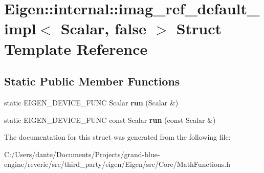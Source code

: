 \hypertarget{struct_eigen_1_1internal_1_1imag__ref__default__impl_3_01_scalar_00_01false_01_4}{}\section{Eigen\+::internal\+::imag\+\_\+ref\+\_\+default\+\_\+impl$<$ Scalar, false $>$ Struct Template Reference}
\label{struct_eigen_1_1internal_1_1imag__ref__default__impl_3_01_scalar_00_01false_01_4}
\subsection*{Static Public Member Functions}
\begin{DoxyCompactItemize}
\item 
\mbox{\label{struct_eigen_1_1internal_1_1imag__ref__default__impl_3_01_scalar_00_01false_01_4_a36b58269f7ca9930113cf22cc1df4b46}} 
static E\+I\+G\+E\+N\+\_\+\+D\+E\+V\+I\+C\+E\+\_\+\+F\+U\+NC Scalar {\bfseries run} (Scalar \&)
\item 
\mbox{\label{struct_eigen_1_1internal_1_1imag__ref__default__impl_3_01_scalar_00_01false_01_4_a5b1b2c224836979c46c628156c7e6813}} 
static E\+I\+G\+E\+N\+\_\+\+D\+E\+V\+I\+C\+E\+\_\+\+F\+U\+NC const Scalar {\bfseries run} (const Scalar \&)
\end{DoxyCompactItemize}


The documentation for this struct was generated from the following file\+:\begin{DoxyCompactItemize}
\item 
C\+:/\+Users/dante/\+Documents/\+Projects/grand-\/blue-\/engine/reverie/src/third\+\_\+party/eigen/\+Eigen/src/\+Core/Math\+Functions.\+h\end{DoxyCompactItemize}
